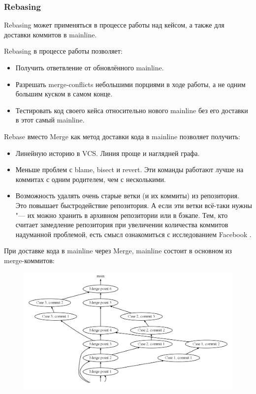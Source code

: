 \documentclass[10pt, a5paper]{article}
\begin{document}
\subsubsection*{Rebasing}

Rebasing может применяться в процессе работы над кейсом, а также для доставки коммитов в mainline.

Rebasing в процессе работы позволяет:

\begin{itemize}
  \item Получить ответвление от обновлённого mainline.
  \item Разрешать merge-conflicts небольшими порциями в ходе работы, а не одним большим куском в самом конце.
  \item Тестировать код своего кейса относительно нового mainline без его доставки в этот самый mainline.
\end{itemize}

Rebase вместо Merge как метод доставки кода в mainline позволяет получить:

\begin{itemize}
  \item Линейную историю в VCS. Линия проще и наглядней графа.
  \item Меньше проблем с blame, bisect и revert. Эти команды работают лучше на коммитах с одним родителем, чем с несколькими.
  \item Возможность удалять очень старые ветки (и их коммиты) из репозитория. Это повышает быстродействие репозитория. А если эти ветки всё-таки нужны "--- их можно хранить в архивном репозитории или в бэкапе. Тем, кто считает замедление репозитория при увеличении количества коммитов надуманной проблемой, есть смысл ознакомиться с исследованием Facebook \cite{Hlebnikov1}.
\end{itemize}

При доставке кода в mainline через Merge, mainline состоит в основном из merge-коммитов:
\begin{figure}[h!]
  \centering
  \includegraphics[scale=0.2]{02_2014_main-merged.png}
\end{figure}
\end{document}
